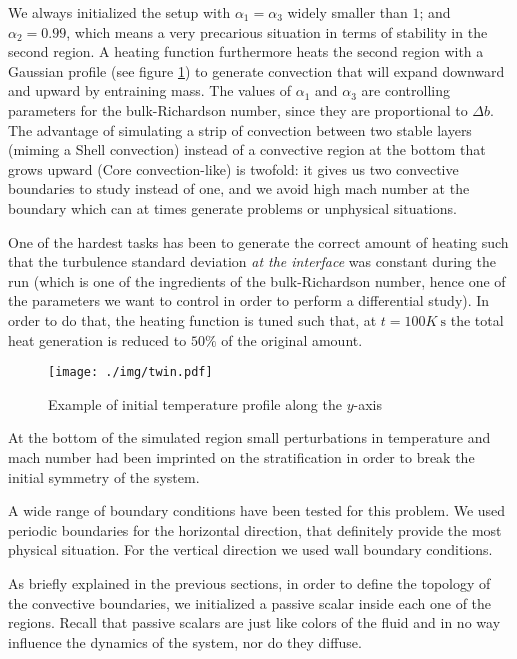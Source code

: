 We always initialized the setup with $\alpha_{1} = \alpha_{3}$ widely smaller than $1$; and $\alpha_{2}=0.99$, which means a very precarious situation in terms of stability in the second region. A heating function furthermore heats the second region with a Gaussian profile (see figure \ref{fig:twin}) to generate convection that will expand downward and upward by entraining mass. The values of $\alpha_{1}$ and $\alpha_{3}$ are controlling parameters for the bulk-Richardson number, since they are proportional to $\Delta b$. The advantage of simulating a strip of convection between two stable layers (miming a Shell convection) instead of a convective region at the bottom that grows upward (Core convection-like) is twofold: it gives us two convective boundaries to study instead of one, and we avoid high mach number at the boundary which can at times generate problems or unphysical situations. 

One of the hardest tasks has been to generate the correct amount of heating such that the turbulence standard deviation \textit{at the interface} was constant during the run (which is one of the ingredients of the bulk-Richardson number, hence one of the parameters we want to control in order to perform a differential study). In order to do that, the heating function is tuned such that, at $t=100K \ \mathrm{s}$ the total heat generation is reduced to $50 \%$ of the original amount.

\begin{figure}[t]
\centering
\texttt{[image: ./img/twin.pdf]}
\caption{Example of initial temperature profile along the $y$-axis}
\label{fig:twin}
\centering
\end{figure}
At the bottom of the simulated region small perturbations in temperature and mach number had been imprinted on the stratification in order to break the initial symmetry of the system.

A wide range of boundary conditions have been tested for this problem. We used periodic boundaries for the horizontal direction, that definitely provide the most physical situation. For the vertical direction we used wall boundary conditions.

As briefly explained in the previous sections, in order to define the topology of the convective boundaries, we initialized a passive scalar inside each one of the regions. Recall that passive scalars are just like colors of the fluid and in no way influence the dynamics of the system, nor do they diffuse.

